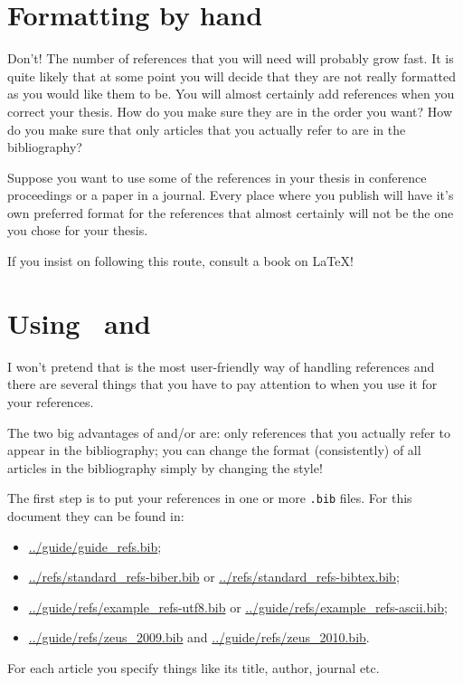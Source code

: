 \section{Formatting by hand}
\label{sec:ref:bibitem}

Don't! The number of references that you will need will probably grow
fast. It is quite likely that at some point you will decide that they
are not really formatted as you would like them to be. You will almost
certainly add references when you correct your thesis. How do you
make sure they are in the order you want? How do you make sure that
only articles that you actually refer to are in the bibliography?

Suppose you want to use some of the references in your thesis in
conference proceedings or a paper in a journal. Every place where you
publish will have it's own preferred format for the references that
almost certainly will not be the one you chose for your thesis.

If you insist on following this route, consult a book on \LaTeX!


\section{Using \BibTeX\ and }
\label{sec:ref:bibtex}

I won't pretend that \BibTeX{} is the most user-friendly way of
handling references and there are several things that you have to pay
attention to when you use it for your references.

The two big advantages of  and/or \BibTeX{} are: only references that you
actually refer to appear in the bibliography; you can change the
format (consistently) of all articles in the bibliography simply by
changing the style!

The first step is to put your references in one or more \texttt{.bib}
files. For this document they can be found in:
\begin{itemize}
\setlength{\itemsep}{0pt}
\item \url{../guide/guide_refs.bib};
\item \url{../refs/standard_refs-biber.bib} or
  \url{../refs/standard_refs-bibtex.bib};
\item \url{../guide/refs/example_refs-utf8.bib} or
  \url{../guide/refs/example_refs-ascii.bib};
\item \url{../guide/refs/zeus_2009.bib} and
  \url{../guide/refs/zeus_2010.bib}.
\end{itemize}
For each article you specify things like its
title, author, journal etc.

